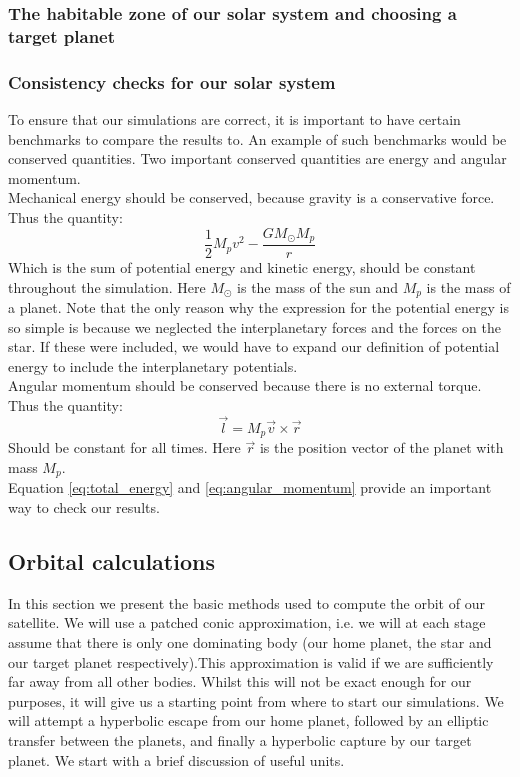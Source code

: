 \documentclass[a4paper,10pt,english]{article}
\begin{document}
\subsubsection{The habitable zone of our solar system and choosing a target planet}
\subsubsection{Consistency checks for our solar system}
To ensure that our simulations are correct, it is important to have certain benchmarks to compare the results to. An example of such benchmarks would be conserved quantities. Two important conserved quantities are energy and angular momentum.\\
\linebreak
Mechanical energy should be conserved, because gravity is a conservative force. Thus the quantity:
\begin{equation}\label{eq:total_energy}
\frac{1}{2}M_pv^2-\frac{GM_{\odot} M_p}{r}
\end{equation}
Which is the sum of potential energy and kinetic energy, should be constant throughout the simulation. Here $M_{\odot}$ is the mass of the sun and $M_p$ is the mass of a planet. Note that the only reason why the expression for the potential energy is so simple is because we neglected the interplanetary forces and the forces on the star. If these were included, we would have to expand our definition of potential energy to include the interplanetary potentials. \\
\linebreak
Angular momentum should be conserved because there is no external torque. Thus the quantity:
\begin{equation}\label{eq:angular_momentum}
\vec{l}=M_p\vec{v}\times \vec{r}
\end{equation}
Should be constant for all times. Here $\vec{r}$ is the position vector of the planet with mass $M_p$.\\
\linebreak
Equation \ref{eq:total_energy} and \ref{eq:angular_momentum} provide an important way to check our results.
\subsection{Orbital calculations}
In this section we present the basic methods used to compute the orbit of our satellite. We will use a patched conic approximation, i.e. we will at each stage assume that there is only one dominating body (our home planet, the star and our target planet respectively).This approximation is valid if we are sufficiently far away from all other bodies. Whilst this will not be exact enough for our purposes, it will give us a starting point from where to start our simulations. We will attempt a hyperbolic escape from our home planet, followed by an elliptic transfer between the planets, and finally a hyperbolic capture by our target planet. We start with a brief discussion of useful units.
\end{document}
